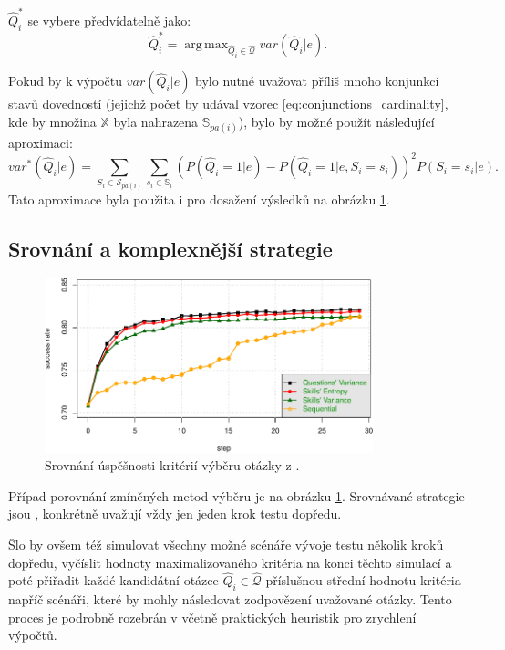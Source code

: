 \documentclass[a4paper,twoside,12pt]{scrbook}
\DeclareMathOperator*{\argmax}{arg\,max}
\begin{document}
$\widehat{Q}^*_i$ se vybere předvídatelně jako:
\begin{equation}
	\widehat{Q}^*_i = \argmax_{\widehat{Q}_i \in \widehat{\mathcal{Q}}} var(\widehat{Q}_i|e).
\end{equation}

Pokud by k výpočtu $var(\widehat{Q}_i|e)$ bylo nutné uvažovat příliš mnoho konjunkcí stavů dovedností (jejichž počet by udával vzorec \ref{eq:conjunctions_cardinality}, kde by množina $\mathbb{X}$ byla nahrazena $\mathbb{S}_{pa(i)}$), bylo by možné použít následující aproximaci:
\begin{equation}
	var^*(\widehat{Q}_i|e) = \sum_{S_i \in \mathcal{S}_{pa(i)}}\sum_{s_i \in \mathbb{S}_i} \left(P(\widehat{Q}_i=1|e) - P(\widehat{Q}_i=1|e, S_i = s_i) \right)^2 P(S_i = s_i|e).
\end{equation}
Tato aproximace byla použita i pro dosažení výsledků na obrázku \ref{fig:question_selection_comparison}.

\subsection{Srovnání a komplexnější strategie}

\begin{figure}
  \centering
    \includegraphics[width=0.85\textwidth]{question_selection_comparison.pdf}
  \caption{Srovnání úspěšnosti kritérií výběru otázky z \cite{question_selection}.}
  \label{fig:question_selection_comparison}
\end{figure}

Případ porovnání zmíněných metod výběru je na obrázku \ref{fig:question_selection_comparison}. Srovnávané strategie jsou , konkrétně uvažují vždy jen jeden krok testu dopředu.

Šlo by ovšem též simulovat všechny možné scénáře vývoje testu několik kroků dopředu, vyčíslit hodnoty maximalizovaného kritéria na konci těchto simulací a poté přiřadit každé kandidátní otázce $\widehat{Q}_i \in \widehat{\mathcal{Q}}$ příslušnou střední hodnotu kritéria napříč scénáři, které by mohly následovat zodpovězení uvažované otázky. Tento proces je podrobně rozebrán v \cite{vomlel_building} včetně praktických heuristik pro zrychlení výpočtů.
\end{document}
